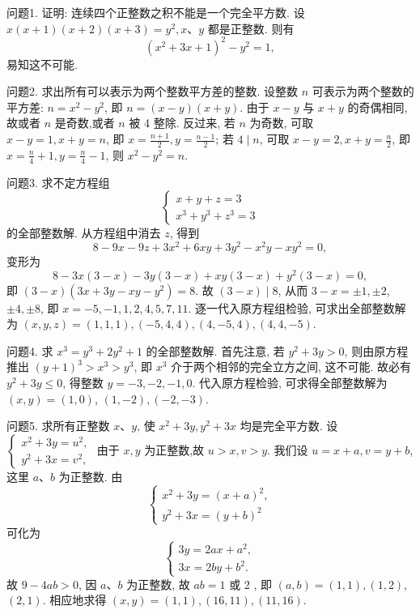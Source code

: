 
问题1. 证明: 连续四个正整数之积不能是一个完全平方数.
设 $x(x+1)(x+2)(x+3)=y^2, x 、 y$ 都是正整数.
则有
$$
\left(x^2+3 x+1\right)^2-y^2=1,
$$
易知这不可能.



问题2. 求出所有可以表示为两个整数平方差的整数.
设整数 $n$ 可表示为两个整数的平方差: $n=x^2-y^2$, 即 $n=(x-y) (x+y)$. 由于 $x-y$ 与 $x+y$ 的奇偶相同,故或者 $n$ 是奇数,或者 $n$ 被 4 整除.
反过来, 若 $n$ 为奇数, 可取 $x-y=1, x+y=n$, 即 $x=\frac{n+1}{2}, y=\frac{n-1}{2}$; 若
$4 \mid n$, 可取 $x-y=2, x+y=\frac{n}{2}$, 即 $x=\frac{n}{4}+1, y=\frac{n}{4}-1$, 则 $x^2-y^2=n$.



问题3. 求不定方程组
$$
\left\{\begin{array}{l}
x+y+z=3 \\
x^3+y^3+z^3=3
\end{array}\right.
$$
的全部整数解.
从方程组中消去 $z$, 得到
$$
8-9 x-9 z+3 x^2+6 x y+3 y^2-x^2 y-x y^2=0,
$$
变形为
$$
8-3 x(3-x)-3 y(3-x)+x y(3-x)+y^2(3-x)=0,
$$
即 $(3-x)\left(3 x+3 y-x y-y^2\right)=8$. 故 $(3-x) \mid 8$, 从而 $3-x= \pm 1, \pm 2$, $\pm 4, \pm 8$, 即 $x=-5,-1,1,2,4,5,7,11$. 逐一代入原方程组检验, 可求出全部整数解为 $(x, y, z)=(1,1,1),(-5,4,4),(4,-5,4),(4,4,-5)$.



问题4. 求 $x^3=y^3+2 y^2+1$ 的全部整数解.
首先注意, 若 $y^2+3 y>0$, 则由原方程推出 $(y+1)^3>x^3>y^3$, 即 $x^3$ 介于两个相邻的完全立方之间, 这不可能.
故必有 $y^2+3 y \leqslant 0$, 得整数 $y= -3,-2,-1,0$. 代入原方程检验, 可求得全部整数解为 $(x, y)=(1,0)$, $(1,-2),(-2,-3)$.



问题5. 求所有正整数 $x 、 y$, 使 $x^2+3 y, y^2+3 x$ 均是完全平方数.
设 $\left\{\begin{array}{l}x^2+3 y=u^2, \\ y^2+3 x=v^2,\end{array}\right.$ 由于 $x, y$ 为正整数,故 $u>x, v>y$. 我们设 $u= x+a, v=y+b$, 这里 $a 、 b$ 为正整数.
由
$$
\left\{\begin{array}{l}
x^2+3 y=(x+a)^2, \\
y^2+3 x=(y+b)^2
\end{array}\right.
$$
可化为
$$
\left\{\begin{array}{l}
3 y=2 a x+a^2, \\
3 x=2 b y+b^2 .
\end{array}\right.
$$
故 $9-4ab>0$, 因 $a 、 b$ 为正整数, 故 $a b=1$ 或 2 , 即 $(a, b)=(1,1),(1,2)$, $(2,1)$. 相应地求得 $(x, y)=(1,1),(16,11),(11,16)$.


